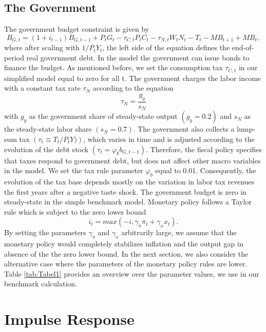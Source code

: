 \documentclass[12pt,a4paper,oneside,titlepage]{article}
\begin{document}
\subsection*{The Government}

The government budget constraint is given by
\begin{equation}
B_{G,t} = \left(1 + i_{t-1}\right)B_{G,t-1} + P_tG_t - \tau_{C,t}P_tC_t - \tau_{N,t}W_tN_t - T_t - MB_{t+1} + MB_t,  \nonumber
\end{equation}
where after scaling with $1/ P_tY_t$, the left side of the equation defines the end-of-period real government debt. In the model the government can issue bonds to finance the budget. As mentioned before, we set the consumption tax $\tau_{C,t}$ in our simplified model equal to zero for all t. The government charges the labor income with a constant tax rate $\tau_N$ according to the equation \[\tau_N = \frac{g_y}{s_N}\] with $g_y$ as the government share of steady-state output $\left(g_y = 0.2 \right)$ and $s_N$ as the steady-state labor share $\left(s_N = 0.7\right)$.
The government also collects a lump-sum tax $\left(\tau_t \equiv T_t/P_tY)\right)$, which varies in time and is adjusted according to the evolution of the debt stock $\left(\tau_t = \varphi_b b_{G,t-1}\right)$. Therefore, the fiscal policy specifies that taxes respond to government debt, but does not affect other macro variables in the model. We set the tax rule parameter $\varphi_b$ equal to 0.01. Consequently, the evolution of the tax base depends mostly on the variation in labor tax revenues the first years after a negative taste shock. The government budget is zero in steady-state in the simple benchmark model.\newline
Monetary policy follows a Taylor rule which is subject to the zero lower bound
\begin{equation}
i_t = max \left(-i, \gamma_{\pi} \pi_t + \gamma_x x_t\right)  \nonumber.
\end{equation}
By setting the parameters $\gamma_{\pi}$ and $\gamma_x$ arbitrarily large, we assume that the monetary policy would completely stabilizes inflation and the output gap in absence of the the zero lower bound. In the next section, we also consider the alternative case where the parameters of the monetary policy rules are lower.\newline
Table \ref{tab:Tabel1} provides an overview over the parameter values, we use in our benchmark calculation.
\bigskip


\section{Impulse Response}
\end{document}
